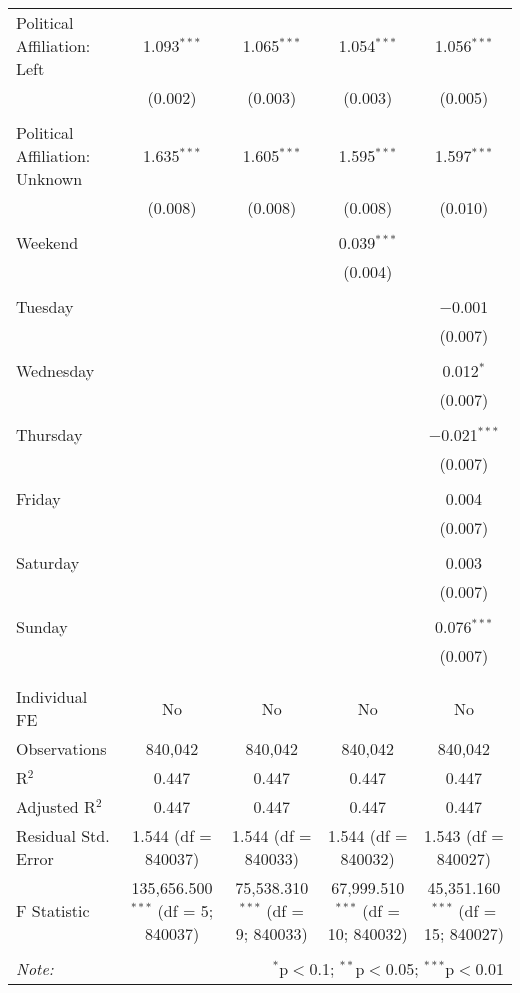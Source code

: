 \documentclass[
]{article}
\begin{document}
\begin{table}[!htbp]
{\begin{tabular}{@{\extracolsep{5pt}}lcccc}
 Political Affiliation: Left & 1.093$^{***}$ & 1.065$^{***}$ & 1.054$^{***}$ & 1.056$^{***}$ \\ 
  & (0.002) & (0.003) & (0.003) & (0.005) \\ 
  & & & & \\ 
 Political Affiliation: Unknown & 1.635$^{***}$ & 1.605$^{***}$ & 1.595$^{***}$ & 1.597$^{***}$ \\ 
  & (0.008) & (0.008) & (0.008) & (0.010) \\ 
  & & & & \\ 
 Weekend &  &  & 0.039$^{***}$ &  \\ 
  &  &  & (0.004) &  \\ 
  & & & & \\ 
 Tuesday &  &  &  & $-$0.001 \\ 
  &  &  &  & (0.007) \\ 
  & & & & \\ 
 Wednesday &  &  &  & 0.012$^{*}$ \\ 
  &  &  &  & (0.007) \\ 
  & & & & \\ 
 Thursday &  &  &  & $-$0.021$^{***}$ \\ 
  &  &  &  & (0.007) \\ 
  & & & & \\ 
 Friday &  &  &  & 0.004 \\ 
  &  &  &  & (0.007) \\ 
  & & & & \\ 
 Saturday &  &  &  & 0.003 \\ 
  &  &  &  & (0.007) \\ 
  & & & & \\ 
 Sunday &  &  &  & 0.076$^{***}$ \\ 
  &  &  &  & (0.007) \\ 
  & & & & \\ 
\hline \\[-1.8ex] 
Individual FE & No & No & No & No \\ 
Observations & 840,042 & 840,042 & 840,042 & 840,042 \\ 
R$^{2}$ & 0.447 & 0.447 & 0.447 & 0.447 \\ 
Adjusted R$^{2}$ & 0.447 & 0.447 & 0.447 & 0.447 \\ 
Residual Std. Error & 1.544 (df = 840037) & 1.544 (df = 840033) & 1.544 (df = 840032) & 1.543 (df = 840027) \\ 
F Statistic & 135,656.500$^{***}$ (df = 5; 840037) & 75,538.310$^{***}$ (df = 9; 840033) & 67,999.510$^{***}$ (df = 10; 840032) & 45,351.160$^{***}$ (df = 15; 840027) \\ 
\hline 
\hline \\[-1.8ex] 
\textit{Note:}  & \multicolumn{4}{r}{$^{*}$p$<$0.1; $^{**}$p$<$0.05; $^{***}$p$<$0.01} \\ 
\end{tabular}
} 
\end{table} 
\newpage
\end{document}
